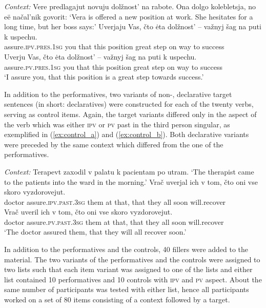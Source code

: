 \documentclass[output=paper,colorlinks,citecolor=brown,newtxmath,hidelinks]{langscibook}
\begin{document}
\ea\label{ex:item} \textit{Context:} Vere predlagajut novuju dolžnost' na rabote. Ona dolgo kolebletsja, no eë načal'nik govorit:
    \glt `Vera is offered a new position at work. She hesitates for a long time, but her boss says:'
	\ea\label{ex:item_a} 
		 \gll    Uverjaju Vas, čto ėta dolžnost' -- važnyj šag na puti k uspechu.\\
              assure\textsc{.ipv.pres.1sg} you that this position {} great step on way to success\\
	\ex\label{ex:item_b}
		 \gll    Uverju Vas, čto ėta dolžnost' -- važnyj šag na puti k uspechu.\\
              assure\textsc{.pv.pres.1sg} you that this position {} great step on way to success\\
              \z
		\glt ‘I assure you, that this position is a great step towards success.’     
\z

\noindent In addition to the performatives, two variants of non-, declarative target sentences (in short: declaratives) were constructed for each of the twenty verbs, serving as control items. Again, the target variants differed only in the aspect of the verb which was either \textsc{ipv} or \textsc{pv} past in the third person singular, as exemplified in (\ref{ex:control_a}) and (\ref{ex:control_b}). Both declarative variants were preceded by the same context which differed from the one of the performatives.

\ea\label{ex:control} \textit{Context:} Terapevt zaxodil v palatu k pacientam po utram.
    \glt ‘The therapist came to the patients into the ward in the morning.’
	\ea\label{ex:control_a} 
		 \gll    Vrač uverjal ich v tom, čto oni vse skoro vyzdorovejut.\\
              doctor assure\textsc{.ipv.past.3sg} them at that, that they all soon will.recover\\
	\ex\label{ex:control_b}
		 \gll    Vrač uveril ich v tom, čto oni vse skoro vyzdorovejut.\\
              doctor assure\textsc{.pv.past.3sg} them at that, that they all soon will.recover\\
              \z
		\glt ‘The doctor assured them, that they will all recover soon.’        
\z

\noindent In addition to the performatives and the controls, 40 fillers were added to the material. The two variants of the performatives and the controls were assigned to two lists such that each item variant was assigned to one of the lists and either list contained 10 performatives and 10 controls with \textsc{ipv} and \textsc{pv} aspect. About the same number of participants was tested with either list, hence all participants worked on a set of 80 items consisting of a context followed by a target. 
\end{document}
